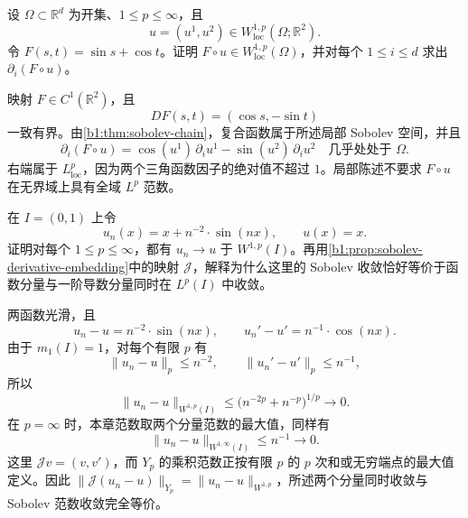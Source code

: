 \begin{exercise}\label{b1:ex:21-basic-vector-chain}
设 \(\Omega\subset\mathbb R^d\) 为开集、\(1\leq p\leq\infty\)，且
\[
 u=(u^1,u^2)\in W^{1,p}_{\mathrm{loc}}(\Omega;\mathbb R^2).
\]
令 \(F(s,t)=\sin s+\cos t\)。证明 \(F\circ u\in W^{1,p}_{\mathrm{loc}}(\Omega)\)，并对每个 \(1\leq i\leq d\) 求出 \(\partial_i(F\circ u)\)。
\end{exercise}
\begin{solution}
映射 \(F\in C^1(\mathbb R^2)\)，且
\[
 DF(s,t)=(\cos s,-\sin t)
\]
一致有界。由\cref{b1:thm:sobolev-chain}，复合函数属于所述局部 Sobolev 空间，并且
\[
 \partial_i(F\circ u)
 =\cos(u^1)\,\partial_i u^1
  -\sin(u^2)\,\partial_i u^2
 \quad\text{几乎处处于 }\Omega.
\]
右端属于 \(L^p_{\mathrm{loc}}\)，因为两个三角函数因子的绝对值不超过 \(1\)。局部陈述不要求 \(F\circ u\) 在无界域上具有全域 \(L^p\) 范数。
\end{solution}

\begin{exercise}\label{b1:ex:21-basic-derivative-embedding}
在 \(I=(0,1)\) 上令
\[
 u_n(x)=x+n^{-2}\cdot \sin(nx),\qquad u(x)=x.
\]
证明对每个 \(1\leq p\leq\infty\)，都有 \(u_n\to u\) 于 \(W^{1,p}(I)\)。再用\cref{b1:prop:sobolev-derivative-embedding}中的映射 \(\mathcal J\)，解释为什么这里的 Sobolev 收敛恰好等价于函数分量与一阶导数分量同时在 \(L^p(I)\) 中收敛。
\end{exercise}
\begin{solution}
两函数光滑，且
\[
 u_n-u=n^{-2}\cdot \sin(nx),\qquad
 u_n'-u'=n^{-1}\cdot \cos(nx).
\]
由于 \(m_1(I)=1\)，对每个有限 \(p\) 有
\[
 \|u_n-u\|_p\leq n^{-2},\qquad
 \|u_n'-u'\|_p\leq n^{-1},
\]
所以
\[
 \|u_n-u\|_{W^{1,p}(I)}
 \leq\bigl(n^{-2p}+n^{-p}\bigr)^{1/p}\longrightarrow0.
\]
在 \(p=\infty\) 时，本章范数取两个分量范数的最大值，同样有
\[
 \|u_n-u\|_{W^{1,\infty}(I)}\leq n^{-1}\longrightarrow0.
\]
这里 \(\mathcal Jv=(v,v')\)，而 \(Y_p\) 的乘积范数正按有限 \(p\) 的 \(p\) 次和或无穷端点的最大值定义。因此 \(\|\mathcal J(u_n-u)\|_{Y_p}=\|u_n-u\|_{W^{1,p}}\)，所述两个分量同时收敛与 Sobolev 范数收敛完全等价。
\end{solution}

